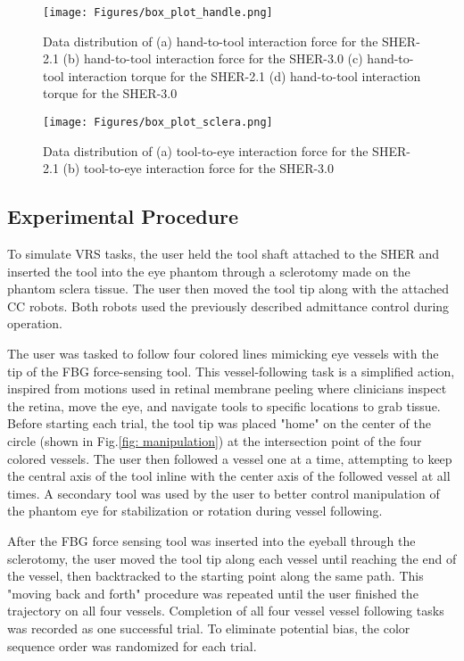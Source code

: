 \documentclass[letterpaper, 10 pt, conference]{ieeeconf}  %
\begin{document}
\begin{figure}[t!]
  \centering
    \texttt{[image: Figures/box\_plot\_handle.png]}
      \caption{Data distribution of (a) hand-to-tool interaction force for the SHER-2.1 (b) hand-to-tool interaction force for the SHER-3.0 (c) hand-to-tool interaction torque for the SHER-2.1 (d) hand-to-tool interaction torque for the SHER-3.0}
      \label{fig: box_handle}
\end{figure}
\begin{figure}[t!]
  \centering
    \texttt{[image: Figures/box\_plot\_sclera.png]}
      \caption{Data distribution of (a) tool-to-eye interaction force for the SHER-2.1 (b) tool-to-eye interaction force for the SHER-3.0}
      \label{fig: box_sclera}
\end{figure}

\subsection{Experimental Procedure}
To simulate VRS tasks, the user held the tool shaft attached to the SHER and inserted the tool into the eye phantom through a sclerotomy made on the phantom sclera tissue. The user then moved the tool tip along with the attached CC robots. Both robots used the previously described admittance control during operation. 

The user was tasked to follow four colored lines mimicking eye vessels with the tip of the FBG force-sensing tool. This vessel-following task is a simplified action, inspired from motions used in retinal membrane peeling where clinicians inspect the retina, move the eye, and navigate tools to specific locations to grab tissue.
Before starting each trial, the tool tip was placed "home" on the center of the circle (shown in Fig.\ref{fig: manipulation}) at the intersection point of the four colored vessels. The user then followed a vessel one at a time,  attempting to keep the central axis of the tool inline with the center axis of the followed vessel at all times. 
A secondary tool was used by the user to better control manipulation of the phantom eye for stabilization or rotation during vessel following. 

After the FBG force sensing tool was inserted into the eyeball through the sclerotomy, the user moved the tool tip along each vessel until reaching the end of the vessel, then backtracked to the starting point along the same path. This "moving back and forth" procedure was repeated until the user finished the trajectory on all four vessels. Completion of all four vessel vessel following tasks was recorded as one successful trial. To eliminate potential bias, the color sequence order was randomized for each trial.
\end{document}
